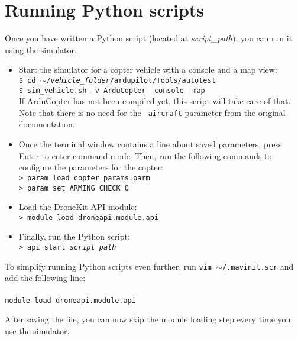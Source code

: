 \documentclass{article}
\begin{document}
\section*{Running Python scripts}
Once you have written a Python script (located at \emph{script\_path}), you can run it using the simulator.

\begin{itemize}
    \item Start the simulator for a copter vehicle with a console and a map view: \\
          {\tt \$ cd $\sim$/\emph{vehicle\_folder}/ardupilot/Tools/autotest} \\
          {\tt \$ sim\_vehicle.sh -v ArduCopter --console --map} \\
          If ArduCopter has not been compiled yet, this script will take care of that. Note that there is
          no need for the {\tt --aircraft} parameter from the original documentation.
    \item Once the terminal window contains a line about saved parameters, press Enter to enter command mode.
          Then, run the following commands to configure the parameters for the copter: \\
          {\tt > param load copter\_params.parm} \\
          {\tt > param set ARMING\_CHECK 0}
    \item Load the DroneKit API module: \\
          {\tt > module load droneapi.module.api}
    \item Finally, run the Python script: \\
          {\tt > api start \emph{script\_path}}
\end{itemize}

\vspace{0.4cm}

To simplify running Python scripts even further, run {\tt vim $\sim$/.mavinit.scr} and add the following line: \\\\
{\tt module load droneapi.module.api}

After saving the file, you can now skip the module loading step every time you use the simulator.
\end{document}
